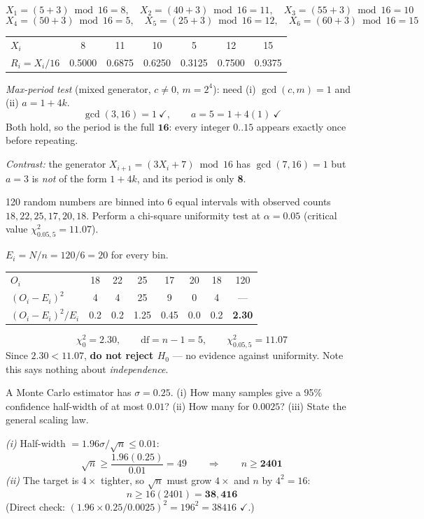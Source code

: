 \begin{probbox}
\ans
\[
X_1 = (5+3)\bmod16 = 8,\quad
X_2 = (40+3)\bmod16 = 11,\quad
X_3 = (55+3)\bmod16 = 10
\]
\[
X_4 = (50+3)\bmod16 = 5,\quad
X_5 = (25+3)\bmod16 = 12,\quad
X_6 = (60+3)\bmod16 = 15
\]
\begin{center}\small
\begin{tabular}{@{}lcccccc@{}}
\toprule
$X_i$ & 8 & 11 & 10 & 5 & 12 & 15\\
$R_i = X_i/16$ & 0.5000 & 0.6875 & 0.6250 & 0.3125 & 0.7500 & 0.9375\\
\bottomrule
\end{tabular}
\end{center}
\emph{Max-period test} (mixed generator, $c\neq0$, $m = 2^4$): need (i) $\gcd(c,m) = 1$ and (ii) $a = 1+4k$.
\[
\gcd(3,16) = 1 \ \checkmark, \qquad a = 5 = 1+4(1) \ \checkmark
\]
Both hold, so the period is the full $\mathbf{16}$: every integer $0..15$ appears exactly once before repeating.

\emph{Contrast:} the generator $X_{i+1} = (3X_i+7)\bmod16$ has $\gcd(7,16)=1$ but $a = 3$ is \emph{not} of the form $1+4k$, and its period is only \textbf{8}.

 120 random numbers are binned into 6 equal intervals with observed counts $18, 22, 25, 17, 20, 18$. Perform a chi-square uniformity test at $\alpha = 0.05$ (critical value $\chi^2_{0.05,5} = 11.07$).

\ans $E_i = N/n = 120/6 = 20$ for every bin.
\begin{center}\small
\begin{tabular}{@{}lcccccc|c@{}}
\toprule
$O_i$ & 18 & 22 & 25 & 17 & 20 & 18 & 120\\
$(O_i-E_i)^2$ & 4 & 4 & 25 & 9 & 0 & 4 & ---\\
$(O_i-E_i)^2/E_i$ & 0.2 & 0.2 & 1.25 & 0.45 & 0.0 & 0.2 & \textbf{2.30}\\
\bottomrule
\end{tabular}
\end{center}
\[
\chi_0^2 = 2.30, \qquad \text{df} = n-1 = 5, \qquad \chi^2_{0.05,5} = 11.07
\]
Since $2.30 < 11.07$, \textbf{do not reject $H_0$} --- no evidence against uniformity. Note this says nothing about \emph{independence}.

 A Monte Carlo estimator has $\sigma = 0.25$. (i) How many samples give a 95\% confidence half-width of at most $0.01$? (ii) How many for $0.0025$? (iii) State the general scaling law.

\ans \emph{(i)} Half-width $= 1.96\sigma/\sqrt n \le 0.01$:
\[
\sqrt n \ge \frac{1.96(0.25)}{0.01} = 49 \qquad\Rightarrow\qquad n \ge \mathbf{2401}
\]
\emph{(ii)} The target is $4\times$ tighter, so $\sqrt n$ must grow $4\times$ and $n$ by $4^2 = 16$:
\[
n \ge 16(2401) = \mathbf{38{,}416}
\]
(Direct check: $(1.96\times0.25/0.0025)^2 = 196^2 = 38416$ $\checkmark$.)


\end{probbox}
